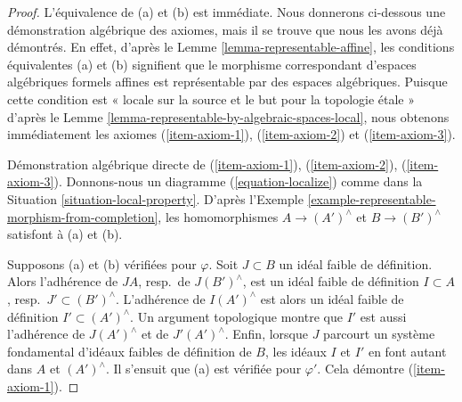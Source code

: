 \begin{proof}
L'équivalence de (a) et (b) est immédiate. Nous donnerons ci-dessous une
démonstration algébrique des axiomes, mais il se trouve que nous les avons déjà
démontrés. En effet, d'après le Lemme \ref{lemma-representable-affine},
les conditions équivalentes (a) et (b) signifient que le
morphisme correspondant d'espaces algébriques formels affines est représentable
par des espaces algébriques.
Puisque cette condition est « locale sur la source et le but pour la topologie étale » d'après le
Lemme \ref{lemma-representable-by-algebraic-spaces-local},
nous obtenons immédiatement les axiomes (\ref{item-axiom-1}), (\ref{item-axiom-2}) et
(\ref{item-axiom-3}).

\medskip\noindent
Démonstration algébrique directe de (\ref{item-axiom-1}), (\ref{item-axiom-2}),
(\ref{item-axiom-3}). Donnons-nous un diagramme (\ref{equation-localize}) comme dans la
Situation \ref{situation-local-property}.
D'après l'Exemple \ref{example-representable-morphism-from-completion},
les homomorphismes $A \to (A')^\wedge$ et $B \to (B')^\wedge$
satisfont à (a) et (b).

\medskip\noindent
Supposons (a) et (b) vérifiées pour $\varphi$. Soit $J \subset B$ un idéal faible
de définition. Alors l'adhérence de $JA$, resp.\ de $J(B')^\wedge$,
est un idéal faible de définition $I \subset A$, resp.\ $J' \subset (B')^\wedge$.
L'adhérence de $I(A')^\wedge$ est alors un idéal faible de définition
$I' \subset (A')^\wedge$. Un argument topologique montre que $I'$ est aussi
l'adhérence de $J(A')^\wedge$ et de $J'(A')^\wedge$.
Enfin, lorsque $J$ parcourt un système fondamental d'idéaux faibles de définition
de $B$, les idéaux $I$ et $I'$ en font autant dans $A$ et $(A')^\wedge$.
Il s'ensuit que (a) est vérifiée pour $\varphi'$. Cela démontre (\ref{item-axiom-1}).


\end{proof}
